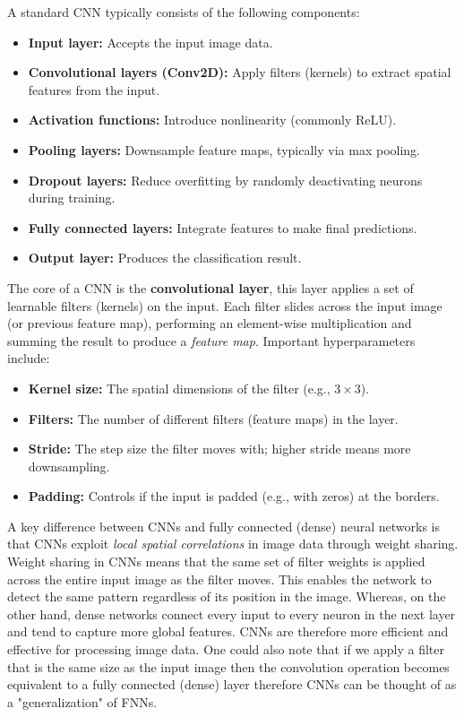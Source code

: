 A standard CNN typically consists of the following components:
\begin{itemize}
    \item \textbf{Input layer:} Accepts the input image data.
    \item \textbf{Convolutional layers (Conv2D):} Apply filters (kernels) to 
    extract spatial features from the input.
    \item \textbf{Activation functions:} Introduce nonlinearity (commonly ReLU).
    \item \textbf{Pooling layers:} Downsample feature maps, typically via max pooling.
    \item \textbf{Dropout layers:} Reduce overfitting by randomly deactivating 
    neurons during training.
    \item \textbf{Fully connected layers:} Integrate features to make final predictions.
    \item \textbf{Output layer:} Produces the classification result.
\end{itemize}

The core of a CNN is the \textbf{convolutional layer}, this layer applies a set of 
learnable filters (kernels) on the input. Each filter slides across the 
input image (or previous feature map), performing an element-wise 
multiplication and summing the result to produce a \emph{feature map}. 
Important hyperparameters include:

\begin{itemize}
    \item \textbf{Kernel size:} The spatial dimensions of the filter (e.g., $3 \times 3$).
    \item \textbf{Filters:} The number of different filters (feature maps) in the layer.
    \item \textbf{Stride:} The step size the filter moves with; higher stride means more downsampling.
    \item \textbf{Padding:} Controls if the input is padded (e.g., with zeros) at the borders.
\end{itemize}

A key difference between CNNs and fully connected (dense) neural networks is that
CNNs exploit \emph{local spatial correlations} in image data through weight sharing.
Weight sharing in CNNs means that the same set of filter weights is 
applied across the entire input image as the filter moves. 
This enables the network 
to detect the same pattern regardless of its position in the image.
Whereas, on the other hand, dense networks connect every input to every 
neuron in the next layer and tend to capture more global features. 
CNNs are therefore more efficient and effective for processing image data.
One could also note that if we apply a filter that is the same size 
as the input image then the convolution operation becomes equivalent to a 
fully connected (dense) layer therefore CNNs can be thought of as a "generalization" of FNNs.


